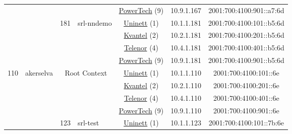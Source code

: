 \begin{small}
\begin{center}
\begin{longtable}{|c|c|c|c|c|c|c|c|}
  &  &  &  & \multicolumn{2}{|c|}{\tiny{\href{http://www.powertech.no}{PowerTech} (9)}} & \tiny{10.9.1.167} & \tiny{2001:700:4100:901::a7:6d} \\* \cline{3-3}\cline{4-4}\cline{5-5}\cline{6-6}\cline{7-7}\cline{8-8}
  &  & \multirow{4}{*}{\tiny{181}} & \multicolumn{1}{|l|}{\multirow{4}{*}{\tiny{srl-nndemo}}} & \multicolumn{2}{|c|}{\tiny{\href{https://www.uninett.no}{Uninett} (1)}} & \tiny{10.1.1.181} & \tiny{2001:700:4100:101::b5:6d} \\* \cline{5-5}\cline{6-6}\cline{7-7}\cline{8-8}
  &  &  &  & \multicolumn{2}{|c|}{\tiny{\href{http://kvantel.no}{Kvantel} (2)}} & \tiny{10.2.1.181} & \tiny{2001:700:4100:201::b5:6d} \\* \cline{5-5}\cline{6-6}\cline{7-7}\cline{8-8}
  &  &  &  & \multicolumn{2}{|c|}{\tiny{\href{https://www.telenor.no}{Telenor} (4)}} & \tiny{10.4.1.181} & \tiny{2001:700:4100:401::b5:6d} \\* \cline{5-5}\cline{6-6}\cline{7-7}\cline{8-8}
  &  &  &  & \multicolumn{2}{|c|}{\tiny{\href{http://www.powertech.no}{PowerTech} (9)}} & \tiny{10.9.1.181} & \tiny{2001:700:4100:901::b5:6d} \\ \hline
 \multirow{32}{*}{\tiny{110}} & \multicolumn{1}{|l|}{\multirow{32}{*}{\tiny{akerselva}}} & \multicolumn{2}{|c|}{\multirow{4}{*}{\tiny{Root Context}}} & \multicolumn{2}{|c|}{\tiny{\href{https://www.uninett.no}{Uninett} (1)}} & \tiny{10.1.1.110} & \tiny{2001:700:4100:101::6e} \\* \cline{5-5}\cline{6-6}\cline{7-7}\cline{8-8}
  &  & \multicolumn{2}{|c|}{} & \multicolumn{2}{|c|}{\tiny{\href{http://kvantel.no}{Kvantel} (2)}} & \tiny{10.2.1.110} & \tiny{2001:700:4100:201::6e} \\* \cline{5-5}\cline{6-6}\cline{7-7}\cline{8-8}
  &  & \multicolumn{2}{|c|}{} & \multicolumn{2}{|c|}{\tiny{\href{https://www.telenor.no}{Telenor} (4)}} & \tiny{10.4.1.110} & \tiny{2001:700:4100:401::6e} \\* \cline{5-5}\cline{6-6}\cline{7-7}\cline{8-8}
  &  & \multicolumn{2}{|c|}{} & \multicolumn{2}{|c|}{\tiny{\href{http://www.powertech.no}{PowerTech} (9)}} & \tiny{10.9.1.110} & \tiny{2001:700:4100:901::6e} \\* \cline{3-3}\cline{4-4}\cline{5-5}\cline{6-6}\cline{7-7}\cline{8-8}
  &  & \multirow{4}{*}{\tiny{123}} & \multicolumn{1}{|l|}{\multirow{4}{*}{\tiny{srl-test}}} & \multicolumn{2}{|c|}{\tiny{\href{https://www.uninett.no}{Uninett} (1)}} & \tiny{10.1.1.123} & \tiny{2001:700:4100:101::7b:6e} \\* \cline{5-5}\cline{6-6}\cline{7-7}\cline{8-8}

\end{longtable}
\end{center}
\end{small}
